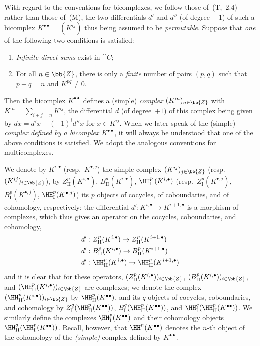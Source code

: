 \begin{env}[11.3.1]
\label{0.11.3.1}
With regard to the conventions for bicomplexes, we follow those of~(T,~2.4) rather than those of~(M), the two differentials $d'$ and $d''$ (of degree~$+1$) of such a bicomplex $K^{\bullet\bullet}=(K^{ij})$ thus being assumed to be \emph{permutable}.
Suppose that \emph{one} of the following two conditions is satisfied:
\begin{enumerate}
   \item \emph{Infinite direct sums} exist in $\cat{C}$;
   \item For all $n\in\bb{Z}$, there is only a \emph{finite} number of pairs $(p,q)$ such that $p+q=n$ and $K^{pq}\neq 0$.
 \end{enumerate}
Then the bicomplex $K^{\bullet\bullet}$ defines a (simple) \emph{complex} $(K^{\prime n})_{n\in\bb{Z}}$ with $K^{\prime n}=\sum_{i+j=n}K^{ij}$, the differential $d$ (of degree~$+1$) of this complex being given by $dx=d'x+(-1)^i d''x$ for $x\in K^{ij}$.
When we later speak of the (simple) \emph{complex defined by a bicomplex $K^{\bullet\bullet}$}, it will always be understood that one of the above conditions is satisfied.
We adopt the analogous conventions for multicomplexes.

We denote by $K^{i,\bullet}$ (resp.~$K^{\bullet,j}$) the simple complex $(K^{ij})_{j\in\bb{Z}}$ (resp.~$(K^{ij})_{i\in\bb{Z}}$), by $Z_\mathrm{II}^p(K^{i,\bullet})$, $B_\mathrm{II}^p(K^{i,\bullet})$, $\HH_\mathrm{II}^p(K^{i,\bullet})$ (resp.~$Z_\mathrm{I}^p(K^{\bullet,j})$, $B_\mathrm{I}^p(K^{\bullet,j})$, $\HH_\mathrm{I}^p(K^{\bullet,j})$) its $p$ objects of cocycles, of coboundaries, and of cohomology, respectively;
the differential $d':K^{i,\bullet}\to K^{i+1,\bullet}$ is a morphism of complexes, which thus gives an operator on the cocycles, coboundaries, and cohomology,
\begin{align*}
  d'&:Z_\mathrm{II}^p(K^{i,\bullet})\to Z_\mathrm{II}^p(K^{i+1,\bullet})
\\d'&:B_\mathrm{II}^p(K^{i,\bullet})\to B_\mathrm{II}^p(K^{i+1,\bullet})
\\d'&:\HH_\mathrm{II}^p(K^{i,\bullet})\to\HH_\mathrm{II}^p(K^{i+1,\bullet})
\end{align*}
and it is clear that for these operators, $(Z_\mathrm{II}^p(K^{i,\bullet}))_{i\in\bb{Z}}$, $(B_\mathrm{II}^p(K^{i,\bullet}))_{i\in\bb{Z}}$, and $(\HH_\mathrm{II}^p(K^{i,\bullet}))_{i\in\bb{Z}}$ are complexes;
we denote the complex $(\HH_\mathrm{II}^p(K^{i,\bullet}))_{i\in\bb{Z}}$ by $\HH_\mathrm{II}^p(K^{\bullet\bullet})$, and its $q$ objects of cocycles, coboundaries, and cohomology by $Z_\mathrm{I}^q(\HH_\mathrm{II}^p(K^{\bullet\bullet}))$, $B_\mathrm{I}^q(\HH_\mathrm{II}^p(K^{\bullet\bullet}))$, and $\HH_\mathrm{I}^q(\HH_\mathrm{II}^p(K^{\bullet\bullet}))$.
We similarly define the complexes $\HH_\mathrm{I}^p(K^{\bullet\bullet})$ and their cohomology objects $\HH_\mathrm{II}^q(\HH_\mathrm{I}^p(K^{\bullet\bullet}))$.
Recall, however, that $\HH^n(K^{\bullet\bullet})$ denotes the $n$-th object of the cohomology of the \emph{(simple)} complex defined by $K^{\bullet\bullet}$.
\end{env}

